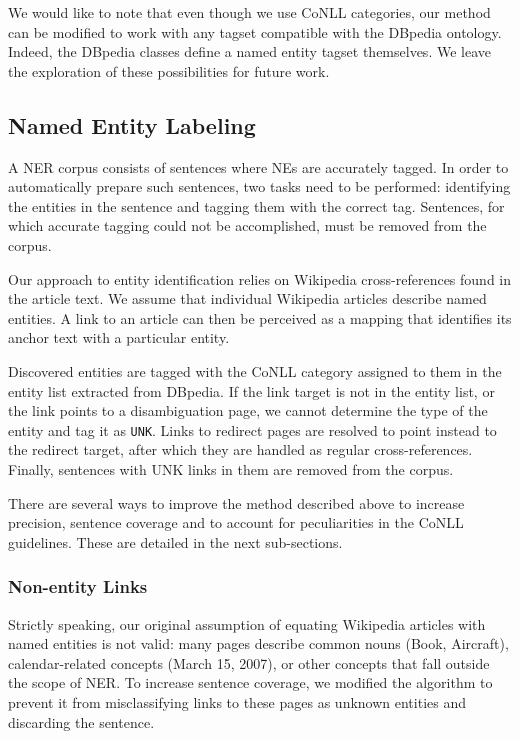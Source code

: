 \documentclass[11pt]{article}
\begin{document}
We would like to note that even though we use CoNLL categories, our method can be modified to work with any tagset compatible with the DBpedia ontology. Indeed, the DBpedia classes define a named entity tagset themselves. We leave the exploration of these possibilities for future work.

\subsection{Named Entity Labeling}

A NER corpus consists of sentences where NEs are accurately tagged. In order to automatically prepare such sentences, two tasks need to be performed: identifying the entities in the sentence and tagging them with the correct tag. Sentences, for which accurate tagging could not be accomplished, must be removed from the corpus.

Our approach to entity identification relies on Wikipedia cross-references found in the article text. We assume that individual Wikipedia articles describe named entities. A link to an article can then be perceived as a mapping that identifies its anchor text with a particular entity.

Discovered entities are tagged with the CoNLL category assigned to them in the entity list extracted from DBpedia. If the link target is not in the entity list, or the link points to a disambiguation page, we cannot determine the type of the entity and tag it as \texttt{UNK}. Links to redirect pages are resolved to point instead to the redirect target, after which they are handled as regular cross-references. Finally, sentences with UNK links in them are removed from the corpus.

There are several ways to improve the method described above to increase precision, sentence coverage and to account for peculiarities in the CoNLL guidelines. These are detailed in the next sub-sections.

\subsubsection{Non-entity Links}

Strictly speaking, our original assumption of equating Wikipedia articles with named entities is not valid: many pages describe common nouns (Book, Aircraft), calendar-related concepts (March 15, 2007), or other concepts that fall outside the scope of NER. To increase sentence coverage, we modified the algorithm to prevent it from misclassifying links to these pages as unknown entities and discarding the sentence.
\end{document}
